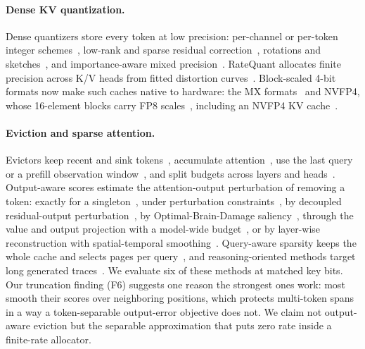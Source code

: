 \documentclass{article}
\theoremstyle{definition}
\begin{document}
\paragraph{Dense KV quantization.}
Dense quantizers store every token at low precision: per-channel or per-token integer schemes~\citep{liu2024kivi,hooper2024kvquant}, low-rank and sparse residual correction~\citep{kang2024gear}, rotations and sketches~\citep{zandieh2024qjl,zandieh2025turboquant}, and importance-aware mixed precision~\citep{yang2024mikv,he2024zipcache}.  RateQuant allocates finite precision across K/V heads from fitted distortion curves~\citep{zuo2026ratequant}.  Block-scaled 4-bit formats now make such caches native to hardware: the MX formats~\citep{ocp2023mx} and NVFP4, whose 16-element blocks carry FP8 scales~\citep{alvarez2025nvfp4}, including an NVFP4 KV cache~\citep{alvarez2025nvfp4kv}.
\paragraph{Eviction and sparse attention.}
Evictors keep recent and sink tokens~\citep{xiao2024streamingllm}, accumulate attention~\citep{zhang2023h2o,liu2023scissorhands}, use the last query~\citep{oren2024tova} or a prefill observation window~\citep{li2024snapkv}, and split budgets across layers and heads~\citep{cai2024pyramidkv,feng2024adakv}.  
Output-aware scores estimate the attention-output perturbation of removing a token: exactly for a singleton~\citep{goel2025caote}, under perturbation constraints~\citep{feng2026criticalkv}, by decoupled residual-output perturbation~\citep{zhang2026dropkv}, by Optimal-Brain-Damage saliency~\citep{gu2026obcache}, through the value and output projection with a model-wide budget~\citep{mai2026laprox}, or by layer-wise reconstruction with spatial-temporal smoothing~\citep{an2026restkv}.  Query-aware sparsity keeps the whole cache and selects pages per query~\citep{tang2024quest}, and reasoning-oriented methods target long generated traces~\citep{cai2025rkv,mao2026triattention}.  We evaluate six of these methods at matched key bits.  Our truncation finding (F6) suggests one reason the strongest ones work: most smooth their scores over neighboring positions, which protects multi-token spans in a way a token-separable output-error objective does not.  We claim not output-aware eviction but the separable approximation that puts zero rate inside a finite-rate allocator.
\end{document}

